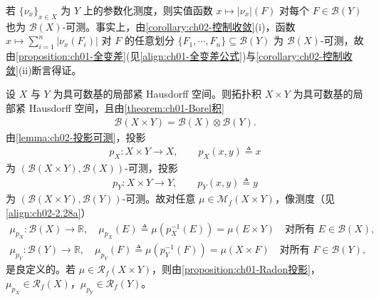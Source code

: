 \documentclass[../../main.tex]{subfiles}%
\begin{document}
\begin{remark}\label{remark:ch05-变差可测}
若 $\{\nu_x\}_{x\in X}$ 为 $Y$ 上的参数化测度，则实值函数 $x\mapsto|\nu_x|(F)$ 对每个 $F\in\mathscr{B}(Y)$ 也为 $\mathscr{B}(X)$-可测。事实上，由\cref{corollary:ch02-控制收敛}(i)，函数 $x\mapsto\sum_{i=1}^n|\nu_x(F_i)|$ 对 $F$ 的任意划分 $\{F_1,\cdots ,F_n\}\subseteq\mathscr{B}(Y)$ 为 $\mathscr{B}(X)$-可测，故由\cref{proposition:ch01-全变差}(见\eqref{align:ch01-全变差公式})与\cref{corollary:ch02-控制收敛}(ii)断言得证。
\end{remark}

设 $X$ 与 $Y$ 为具可数基的局部紧 Hausdorff 空间。则拓扑积 $X\times Y$ 为具可数基的局部紧 Hausdorff 空间，且由\cref{theorem:ch01-Borel积}
\begin{align*}
\mathscr{B}(X\times Y)=\mathscr{B}(X)\otimes\mathscr{B}(Y).
\end{align*}
由\cref{lemma:ch02-投影可测}，投影
\begin{align*}
p_X:X\times Y\to X,\qquad p_X(x,y)\triangleq x
\end{align*}
为 $(\mathscr{B}(X\times Y),\mathscr{B}(X))$-可测，投影
\begin{align*}
p_Y:X\times Y\to Y,\qquad p_Y(x,y)\triangleq y
\end{align*}
为 $(\mathscr{B}(X\times Y),\mathscr{B}(Y))$-可测。故对任意 $\mu\in\mathcal{M}_f(X\times Y)$，像测度（见\eqref{align:ch02-2.28a}）
\begin{align}
\mu_{p_X}:\mathscr{B}(X)\to\mathbb{R},\quad
\mu_{p_X}(E)\triangleq \mu(p_X^{-1}(E))=\mu(E\times Y)
\quad\text{对所有 }E\in\mathscr{B}(X),\label{align:ch05-5.32}\\
\mu_{p_Y}:\mathscr{B}(Y)\to\mathbb{R},\quad
\mu_{p_Y}(F)\triangleq \mu(p_Y^{-1}(F))=\mu(X\times F)
\quad\text{对所有 }F\in\mathscr{B}(Y),\label{align:ch05-5.33}
\end{align}
是良定义的。若 $\mu\in\mathscr{R}_f(X\times Y)$，则由\cref{proposition:ch01-Radon投影}，$\mu_{p_X}\in\mathscr{R}_f(X)$，$\mu_{p_Y}\in\mathscr{R}_f(Y)$。
\end{document}

